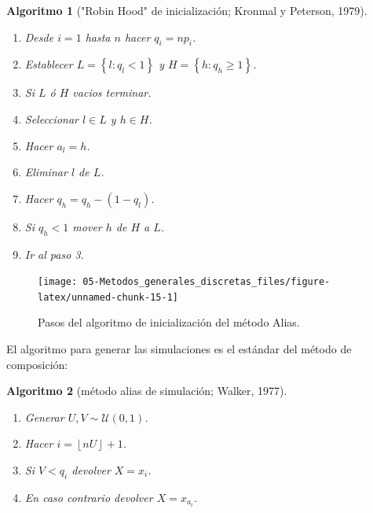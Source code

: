 \documentclass[
]{book}
\theoremstyle{break}
\newtheorem{conjecture}{Algoritmo}[chapter]
\theoremstyle{nonumberplain}
\begin{document}
\begin{conjecture}["Robin Hood" de inicialización; Kronmal y Peterson, 1979]
\protect\hypertarget{cnj:robin-hood}{}\label{cnj:robin-hood}

\begin{enumerate}
\def\labelenumi{\arabic{enumi}.}
\item
  Desde \(i=1\) hasta \(n\) hacer \(q_{i}=np_{i}\).
\item
  Establecer \(L=\left\{ l:q_{l}<1\right\}\) y
  \(H=\left\{ h:q_{h}\geq 1\right\}\).
\item
  Si \(L\) ó \(H\) vacios terminar.
\item
  Seleccionar \(l\in L\) y \(h\in H\).
\item
  Hacer \(a_{l}=h\).
\item
  Eliminar \(l\) de \(L\).
\item
  Hacer \(q_{h}=q_{h}-\left( 1-q_{l}\right)\).
\item
  Si \(q_{h}<1\) mover \(h\) de \(H\) a \(L\).
\item
  Ir al paso 3.
\end{enumerate}

\end{conjecture}

\begin{figure}[!htb]

{\centering \texttt{[image: 05-Metodos\_generales\_discretas\_files/figure-latex/unnamed-chunk-15-1]} 

}

\caption{Pasos del algoritmo de inicialización del método Alias.}\label{fig:unnamed-chunk-15}
\end{figure}

El algoritmo para generar las simulaciones es el estándar del método de composición:

\begin{conjecture}[método alias de simulación; Walker, 1977]
\protect\hypertarget{cnj:walker}{}\label{cnj:walker}

\begin{enumerate}
\def\labelenumi{\arabic{enumi}.}
\item
  Generar \(U,V\sim \mathcal{U}\left( 0,1\right)\).
\item
  Hacer \(i=\left\lfloor nU\right\rfloor +1\).
\item
  Si \(V<q_{i}\) devolver \(X=x_{i}\).
\item
  En caso contrario devolver \(X=x_{a_{i}}\).
\end{enumerate}

\end{conjecture}
\end{document}
